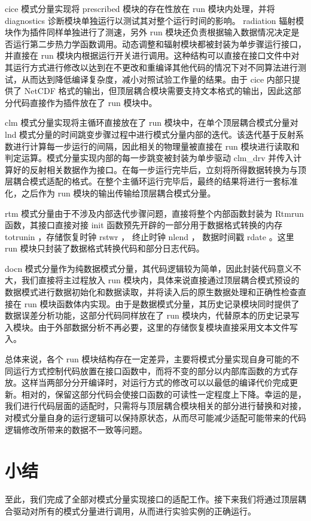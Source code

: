 cice 模式分量实现将 prescribed 模块的存在性放在 run 模块内处理，并将 diagnostics 诊断模块单独运行以测试其对整个运行时间的影响。 radiation 辐射模块作为插件同样单独进行了测速，另外 run 模块还负责根据输入数据情况决定是否运行第二步热力学函数调用。动态调整和辐射模块都被封装为单步骤运行接口，并直接在 run 模块内根据运行开关进行调用。这种结构可以直接在接口文件中对其运行方式进行修改以达到在不更改和重编译其他代码的情况下对不同算法进行测试，从而达到降低编译复杂度，减小对照试验工作量的结果。由于 cice 内部只提供了 NetCDF 格式的输出，但顶层耦合模块需要支持文本格式的输出，因此这部分代码直接作为插件放在了 run 模块中。

clm 模式分量实现将主循环直接放在了 run 模块中，在单个顶层耦合模式分量对 lnd 模式分量的时间跳变步骤过程中进行模式分量内部的迭代。该迭代基于反射系数进行计算每一步运行的间隔，因此相关的物理量被直接在 run 模块进行读取和判定运算。模式分量实现内部的每一步跳变被封装为单步驱动 clm\_drv 并传入计算好的反射相关数据作为接口。在每一步运行完毕后，立刻将所得数据转换为与顶层耦合模式适配的格式。在整个主循环运行完毕后，最终的结果将进行一套标准化，之后作为 run 模块的输出传输给顶层耦合模式分量。

rtm 模式分量由于不涉及内部迭代步骤问题，直接将整个内部函数封装为 Rtmrun 函数，其接口直接对接 init 函数预先开辟的一部分用于数据格式转换的内存 totrunin ，存储恢复时钟 rstwr ， 终止时钟 nlend ， 数据时间戳 rdate 。这里 run 模块只封装了数据格式转换代码和部分日志代码。

docn 模式分量作为纯数据模式分量，其代码逻辑较为简单，因此封装代码意义不大，我们直接将主过程放入 run 模块内，具体来说直接通过顶层耦合模式预设的数据模式进行数据初始化和数据读取，并将读入后的原生数据处理和正确性检查直接在 run 模块函数体内实现。由于是数据模式分量，其历史记录模块同时提供了数据误差分析功能，这部分代码同样放在了 run 模块内，代替原本的历史记录写入模块。由于外部数据分析不再必要，这里的存储恢复模块直接采用文本文件写入。

总体来说，各个 run 模块结构存在一定差异，主要将模式分量实现自身可能的不同运行方式控制代码放置在接口函数中，而将不变的部分以内部库函数的方式存放。这样当两部分分开编译时，对运行方式的修改可以以最低的编译代价完成更新。相对的，保留这部分代码会使接口函数的可读性一定程度上下降。幸运的是，我们进行代码层面的适配时，只需将与顶层耦合模块相关的部分进行替换和对接，对模式分量自身的运行逻辑可以保持原状态，从而尽可能减少适配可能带来的代码逻辑修改所带来的数据不一致等问题。

\section{小结}

至此，我们完成了全部对模式分量实现接口的适配工作。接下来我们将通过顶层耦合驱动对所有的模式分量进行调用，从而进行实验实例的正确运行。
